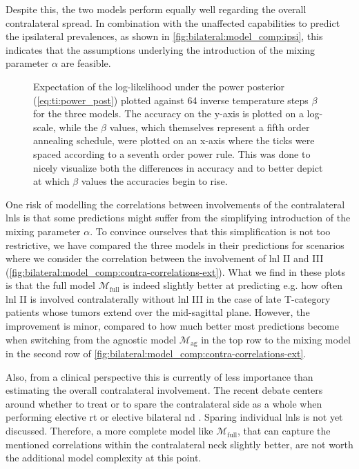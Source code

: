 \documentclass[\relativeRoot/main.tex]{subfiles}
\begin{document}
Despite this, the two models perform equally well regarding the overall contralateral spread. In combination with the unaffected capabilities to predict the ipsilateral prevalences, as shown in \cref{fig:bilateral:model_comp:ipsi}, this indicates that the assumptions underlying the introduction of the mixing parameter $\alpha$ are feasible.

\begin{figure}
    \centering
    
    \caption[
        Accuracy over the course of thermodynamic integration
    ]{
        Expectation of the log-likelihood under the power posterior (\cref{eq:ti:power_post}) plotted against 64 inverse temperature steps $\beta$ for the three models. The accuracy on the y-axis is plotted on a log-scale, while the $\beta$ values, which themselves represent a fifth order annealing schedule, were plotted on an x-axis where the ticks were spaced according to a seventh order power rule. This was done to nicely visualize both the differences in accuracy and to better depict at which $\beta$ values the accuracies begin to rise.
    }
    \label{fig:bilateral:model_comp:thermo_int}
\end{figure}

One risk of modelling the correlations between involvements of the contralateral \glspl{lnl} is that some predictions might suffer from the simplifying introduction of the mixing parameter $\alpha$. To convince ourselves that this simplification is not too restrictive, we have compared the three models in their predictions for scenarios where we consider the correlation between the involvement of \gls{lnl} II and III (\cref{fig:bilateral:model_comp:contra-correlations-ext}). What we find in these plots is that the full model $\mathcal{M}_\text{full}$ is indeed slightly better at predicting e.g. how often \gls{lnl} II is involved contralaterally without \gls{lnl} III in the case of late T-category patients whose tumors extend over the mid-sagittal plane. However, the improvement is minor, compared to how much better most predictions become when switching from the agnostic model $\mathcal{M}_\text{ag}$ in the top row to the mixing model in the second row of \cref{fig:bilateral:model_comp:contra-correlations-ext}.

Also, from a clinical perspective this is currently of less importance than estimating the overall contralateral involvement. The recent debate centers around whether to treat or to spare the contralateral side as a whole when performing elective \acrlong{rt} or elective bilateral \acrlong{nd} \cite{biau_selection_2019,al-mamgani_contralateral_2017}. Sparing individual \glspl{lnl} is not yet discussed. Therefore, a more complete model like $\mathcal{M}_\text{full}$, that can capture the mentioned correlations within the contralateral neck slightly better, are not worth the additional model complexity at this point.
\end{document}
